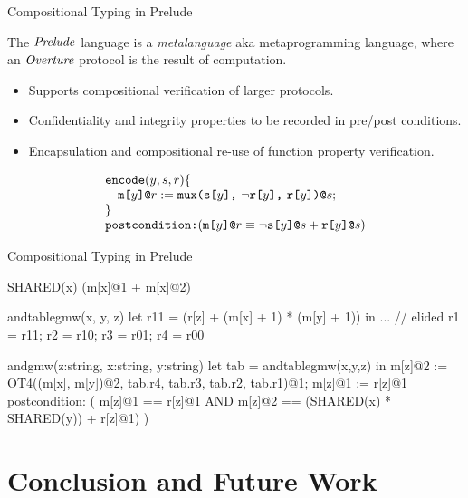 \documentclass{beamer}
\begin{document}
\begin{frame}{Compositional Typing in Prelude}

The $\mathit{Prelude}$ language is a \emph{metalanguage} aka metaprogramming
language, where an $\mathit{Overture}$ protocol is the result of
computation.
\begin{itemize}
\item Supports compositional verification of larger
  protocols.
\item Confidentiality and integrity properties to be recorded in pre/post
  conditions.
\item Encapsulation and compositional re-use of function property verification.
\end{itemize}

$$
\begin{array}{l}
\texttt{encode}(y,s,r) \{\\
\quad \texttt{m[}y\texttt{]}\texttt{@}r := \texttt{mux(} \texttt{s[}y\texttt{]} \texttt{,}\ \neg\texttt{r[}y\texttt{]} \texttt{,}\ \texttt{r[}y\texttt{]} \texttt{)}\texttt{@}s;\\
\}\\
\texttt{postcondition:} ( \texttt{m[}y\texttt{]}\texttt{@}r \equiv \neg\texttt{s[}y\texttt{]}\texttt{@}s + \texttt{r[}y\texttt{]}\texttt{@}s )
\end{array}
$$
  
\end{frame}

\begin{frame}[fragile]{Compositional Typing in Prelude}
  \small{
  \begin{verbatimtab}
SHARED(x) { (m[x]@1 + m[x]@2) }

andtablegmw(x, y, z) {
  let r11 = (r[z] + (m[x] + 1) * (m[y] + 1)) in
  ... // elided
  { r1 = r11; r2 = r10; r3 = r01; r4 = r00 }
}

andgmw(z:string, x:string, y:string) {
  let tab = andtablegmw(x,y,z) in
  m[z]@2 := OT4((m[x], m[y])@2, tab.r4, tab.r3, tab.r2, tab.r1)@1;
  m[z]@1 := r[z]@1
}
postcondition: ( m[z]@1 == r[z]@1 AND
                 m[z]@2 == (SHARED(x) * SHARED(y)) + r[z]@1) ) 
  \end{verbatimtab}
  }
\end{frame}

\section{Conclusion and Future Work}

\end{document}
